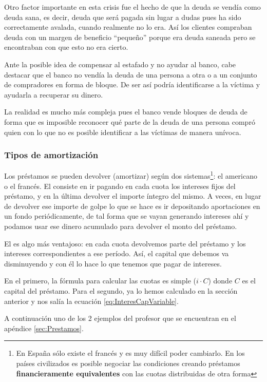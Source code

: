 \documentclass[nochap,palatino,shortheader]{apuntes}
\newcommand{\study}[1]{#1} \newcommand{\substudy}[1]{#1}
\begin{document}
Otro factor importante en esta crisis fue el hecho de que la deuda se vendía como deuda sana, es decir, deuda que será pagada sin lugar a dudas pues ha sido correctamente avalada, cuando realmente no lo era. Así los clientes compraban deuda con un margen de beneficio ``pequeño'' porque era deuda saneada pero se encontraban con que esto no era cierto.

Ante la posible idea de compensar al estafado y no ayudar al banco, cabe destacar que el banco no vendía la deuda de una persona a otra o a un conjunto de compradores en forma de bloque. De ser así podría identificarse a la víctima y ayudarla a recuperar su dinero.

La realidad es mucho más compleja pues el banco vende bloques de deuda de forma que es imposible reconocer qué parte de la deuda de una persona compró quien con lo que no es posible identificar a las víctimas de manera unívoca.

\subsubsection{Tipos de amortización}

Los préstamos se pueden devolver (amortizar) según dos sistemas\footnote{\study{En España sólo existe el francés} y es muy difícil poder cambiarlo. En los países civilizados es posible negociar las condiciones creando préstamos \textbf{financieramente equivalentes} con las cuotas distribuidas de otra forma}: el americano o el francés.
El  consiste en ir \substudy{pagando en cada cuota los intereses fijos} del préstamo, y \substudy{en la última devolver el importe íntegro} del mismo.
A veces, en lugar de devolver ese importe de golpe lo que se hace es ir depositando aportaciones en un fondo periódicamente, de tal forma que se vayan generando intereses ahí y podamos usar ese dinero acumulado para devolver el monto del préstamo.

El  es algo más ventajoso: \substudy{en cada cuota devolvemos parte del préstamo y los intereses correspondientes a ese período}. Así, el capital que debemos va disminuyendo y con él lo hace lo que tenemos que pagar de intereses.

En el primero, la fórmula para calcular las cuotas es simple ($i·C$) donde $C$ es el capital del préstamo. Para el segundo, ya lo hemos calculado en la sección anterior y nos salía la ecuación \eqref{eq:InteresCapVariable}.


A continuación uno de los 2 ejemplos del profesor que se encuentran en el apéndice \ref{sec:Prestamos}.
\end{document}
